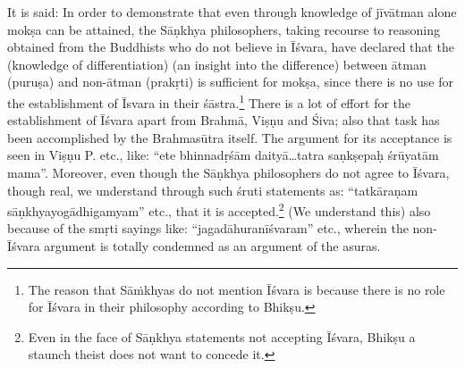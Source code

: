 It is said: In order to demonstrate that even through knowledge of jīvātman alone mokṣa can be attained, the Sāṇkhya philosophers, taking recourse to reasoning obtained from the Buddhists who do not believe in Īśvara, have declared that the (knowledge of differentiation) (an insight into the difference) between ātman (puruṣa) and non-ātman (prakṛti) is sufficient  for mokṣa, since there is no use for the establishment of Īsvara in their śāstra.\footnote{The reason that Sāṁkhyas do not mention Īśvara is because there is no role for Īśvara in their philosophy according to Bhikṣu.} There is a lot of effort for the establishment of Īśvara apart from Brahmā, Viṣṇu and Śiva; also that task has been accomplished by the Brahmasūtra itself. The argument for its acceptance is seen in Viṣṇu P. etc., like: “ete bhinnadṛśām daityā…tatra saṇkṣepaḥ śrūyatām mama”. Moreover, even though the Sāṇkhya philosophers do not agree to Īśvara, though real, we understand through such śruti statements as:  “tatkāraṇam sāṇkhyayogādhigamyam” etc., that it is accepted.\footnote{Even in the face of Sāṇkhya statements not accepting Īśvara, Bhikṣu a staunch theist does not want to concede it.} (We understand this) also because of the smṛti sayings like: “jagadāhuranīśvaram” etc., wherein the non-Īśvara argument is totally condemned as an argument of the asuras.


